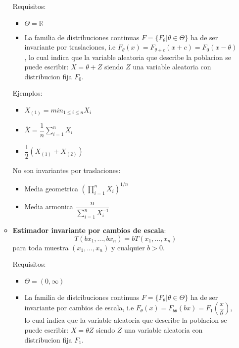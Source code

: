 \documentclass[10pt]{extarticle}
\newcommand{\R}{\mathbb{R}}
\newcommand{\<}{\langle}
\renewcommand{\>}{\rangle}
\theoremstyle{definition}
\begin{document}
\begin{itemize}
\begin{itemize}
                Requisitos:
                \begin{itemize}
                  \item $\Theta = \R$
                  \item La familia de distribuciones continuas $F=\{F_\theta | \theta \in \Theta \}$ ha de ser invariante por traslaciones, i.e $F_\theta(x)=F_{\theta+c}(x+c)=F_0(x - \theta)$, lo cual indica que la variable aleatoria que describe la poblacion se puede escribir: $X=\theta + Z$ siendo $Z$ una variable aleatoria con distribucion fija $F_0$.
                \end{itemize}

                Ejemplos:
                \begin{itemize}
                  \item $X_{(1)} = min_{1\leq i\leq n}X_i$
                  \item $\overline{X}=\dfrac{1}{n}\sum_{i=1}^n X_i$
                  \item $\dfrac{1}{2}(X_{(1)} + X_{(2)})$
                \end{itemize}

                No son invariantes por traslaciones:
                \begin{itemize}
                  \item Media geometrica $(\prod_{i=1}^n X_i)^{1/n}$
                  \item Media armonica $\dfrac{n}{\sum_{i=1}^n X_i^{-1}}$
                \end{itemize}

          \item \textbf{Estimador invariante por cambios de escala}:
                \begin{equation*}
                  T(bx_1,...,bx_n)=bT(x_1,...,x_n)
                \end{equation*}
                para toda muestra $(x_1, ..., x_n)$ y cualquier $b >0$.

                Requisitos:
                \begin{itemize}
                  \item $\Theta = (0, \infty)$
                  \item La familia de distribuciones continuas $F=\{F_\theta | \theta \in \Theta \}$ ha de ser invariante por cambios de escala, i.e $F_\theta(x)=F_{b\theta}(bx)=F_1(\dfrac{x}{\theta})$, lo cual indica que la variable aleatoria que describe la poblacion se puede escribir: $X=\theta Z$ siendo $Z$ una variable aleatoria con distribucion fija $F_1$.
                \end{itemize}


\end{itemize}
\end{itemize}
\end{document}
